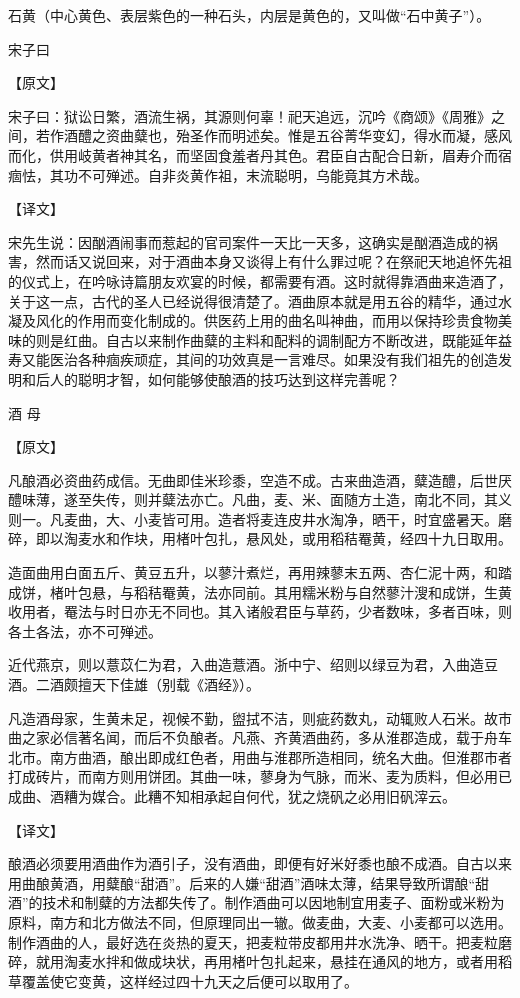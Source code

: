 \documentclass[12pt,UTF8]{ctexbook}
\begin{document}
石黄（中心黄色、表层紫色的一种石头，内层是黄色的，又叫做“石中黄子”）。

宋子曰

【原文】

宋子曰：狱讼日繁，酒流生祸，其源则何辜！祀天追远，沉吟《商颂》《周雅》之间，若作酒醴之资曲糵也，殆圣作而明述矣。惟是五谷菁华变幻，得水而凝，感风而化，供用岐黄者神其名，而坚固食羞者丹其色。君臣自古配合日新，眉寿介而宿痼怯，其功不可殚述。自非炎黄作祖，末流聪明，乌能竟其方术哉。

【译文】

宋先生说：因酗酒闹事而惹起的官司案件一天比一天多，这确实是酗酒造成的祸害，然而话又说回来，对于酒曲本身又谈得上有什么罪过呢？在祭祀天地追怀先祖的仪式上，在吟咏诗篇朋友欢宴的时候，都需要有酒。这时就得靠酒曲来造酒了，关于这一点，古代的圣人已经说得很清楚了。酒曲原本就是用五谷的精华，通过水凝及风化的作用而变化制成的。供医药上用的曲名叫神曲，而用以保持珍贵食物美味的则是红曲。自古以来制作曲糵的主料和配料的调制配方不断改进，既能延年益寿又能医治各种痼疾顽症，其间的功效真是一言难尽。如果没有我们祖先的创造发明和后人的聪明才智，如何能够使酿酒的技巧达到这样完善呢？

酒 母

【原文】

凡酿酒必资曲药成信。无曲即佳米珍黍，空造不成。古来曲造酒，糵造醴，后世厌醴味薄，遂至失传，则并糵法亦亡。凡曲，麦、米、面随方土造，南北不同，其义则一。凡麦曲，大、小麦皆可用。造者将麦连皮井水淘净，晒干，时宜盛暑天。磨碎，即以淘麦水和作块，用楮叶包扎，悬风处，或用稻秸罨黄，经四十九日取用。

造面曲用白面五斤、黄豆五升，以蓼汁煮烂，再用辣蓼末五两、杏仁泥十两，和踏成饼，楮叶包悬，与稻秸罨黄，法亦同前。其用糯米粉与自然蓼汁溲和成饼，生黄收用者，罨法与时日亦无不同也。其入诸般君臣与草药，少者数味，多者百味，则各土各法，亦不可殚述。

近代燕京，则以薏苡仁为君，入曲造薏酒。浙中宁、绍则以绿豆为君，入曲造豆酒。二酒颇擅天下佳雄（别载《酒经》）。

凡造酒母家，生黄未足，视候不勤，盥拭不洁，则疵药数丸，动辄败人石米。故市曲之家必信著名闻，而后不负酿者。凡燕、齐黄酒曲药，多从淮郡造成，载于舟车北市。南方曲酒，酿出即成红色者，用曲与淮郡所造相同，统名大曲。但淮郡市者打成砖片，而南方则用饼团。其曲一味，蓼身为气脉，而米、麦为质料，但必用已成曲、酒糟为媒合。此糟不知相承起自何代，犹之烧矾之必用旧矾滓云。

【译文】

酿酒必须要用酒曲作为酒引子，没有酒曲，即便有好米好黍也酿不成酒。自古以来用曲酿黄酒，用糵酿“甜酒”。后来的人嫌“甜酒”酒味太薄，结果导致所谓酿“甜酒”的技术和制糵的方法都失传了。制作酒曲可以因地制宜用麦子、面粉或米粉为原料，南方和北方做法不同，但原理同出一辙。做麦曲，大麦、小麦都可以选用。制作酒曲的人，最好选在炎热的夏天，把麦粒带皮都用井水洗净、晒干。把麦粒磨碎，就用淘麦水拌和做成块状，再用楮叶包扎起来，悬挂在通风的地方，或者用稻草覆盖使它变黄，这样经过四十九天之后便可以取用了。
\end{document}
